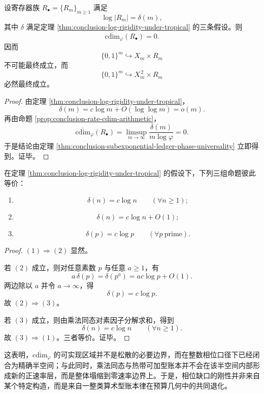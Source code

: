 \begin{corollary}[算术型账本族不能闭合单相位缺口]\label{cor:conclusion-multiplicative-tropical-ledgers-cannot-close-single-phase-gap}
设寄存器族 \(R_\bullet=\{R_m\}_{m\ge 1}\) 满足
\[
\log |R_m|=\delta(m),
\]
其中 \(\delta\) 满足定理 \ref{thm:conclusion-log-rigidity-under-tropical} 的三条假设。则
\[
\overline{\mathrm{cdim}}_{\varphi}(R_\bullet)=0.
\]
因而
\[
\{0,1\}^m\hookrightarrow X_m\times R_m
\]
不可能最终成立，而
\[
\{0,1\}^m\hookrightarrow X_m^{\,2}\times R_m
\]
必然最终成立。
\end{corollary}
\begin{proof}
由定理 \ref{thm:conclusion-log-rigidity-under-tropical}，
\[
\delta(m)=c\log m+O(\log\log m)=o(m).
\]
再由命题 \ref{prop:conclusion-rate-cdim-arithmetic}，
\[
\overline{\mathrm{cdim}}_{\varphi}(R_\bullet)
=
\limsup_{m\to\infty}\frac{\delta(m)}{m\log\varphi}
=0.
\]
于是结论由定理 \ref{thm:conclusion-subexponential-ledger-phase-universality} 立即得到。证毕。
\end{proof}

\begin{theorem}\label{thm:conclusion-multiplicative-tropical-exactness-triad}
在定理 \ref{thm:conclusion-log-rigidity-under-tropical} 的假设下，下列三组命题彼此等价：
\begin{enumerate}
  \item \[
  \delta(n)=c\log n
  \qquad (\forall n\ge 1);
  \]
  \item \[
  \delta(n)=c\log n+O(1);
  \]
  \item \[
  \delta(p)=c\log p
  \qquad (\forall p\ \text{prime}).
  \]
\end{enumerate}
\end{theorem}
\begin{proof}
\((1)\Rightarrow(2)\) 显然。

若 \((2)\) 成立，则对任意素数 \(p\) 与任意 \(a\ge 1\)，有
\[
a\,\delta(p)=\delta(p^a)=ac\log p+O(1).
\]
两边除以 \(a\) 并令 \(a\to\infty\)，得
\[
\delta(p)=c\log p.
\]
故 \((2)\Rightarrow(3)\)。

若 \((3)\) 成立，则由乘法同态对素因子分解求和，得到
\[
\delta(n)=c\log n
\qquad (\forall n\ge 1).
\]
故 \((3)\Rightarrow(1)\)。三者等价。证毕。
\end{proof}

\noindent
这表明，\(\overline{\mathrm{cdim}}_{\varphi}\) 的可实现区域并不是松散的必要边界，而在整数相位口径下已经闭合为精确半空间；与此同时，乘法同态与热带可加型账本并不会在该半空间内部形成新的正速率层，而是整体塌缩到零速率边界上。于是，相位缺口的刚性并非来自某个特定构造，而是来自一整类算术型账本律在预算几何中的共同退化。

